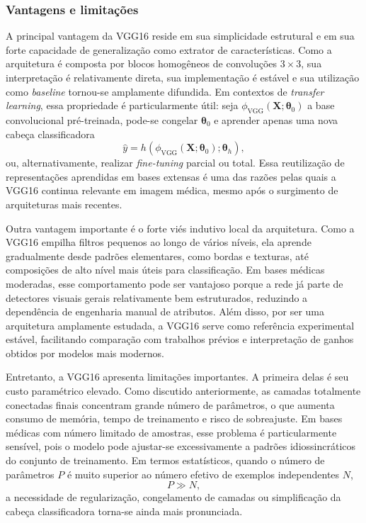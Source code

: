 \documentclass[tcc,capa]{texufpel}
\begin{document}
\subsubsection{Vantagens e limitações}

A principal vantagem da VGG16 reside em sua simplicidade estrutural e em sua forte capacidade de generalização como extrator de características. Como a arquitetura é composta por blocos homogêneos de convoluções \(3\times 3\), sua interpretação é relativamente direta, sua implementação é estável e sua utilização como \textit{baseline} tornou-se amplamente difundida. Em contextos de \textit{transfer learning}, essa propriedade é particularmente útil: seja \(\phi_{\text{VGG}}(\mathbf{X};\boldsymbol{\theta}_0)\) a base convolucional pré-treinada, pode-se congelar \(\boldsymbol{\theta}_0\) e aprender apenas uma nova cabeça classificadora
\begin{equation}
	\hat{y}
	=
	h\!\left(\phi_{\text{VGG}}(\mathbf{X};\boldsymbol{\theta}_0);\boldsymbol{\theta}_h\right),
\end{equation}
ou, alternativamente, realizar \textit{fine-tuning} parcial ou total. Essa reutilização de representações aprendidas em bases extensas é uma das razões pelas quais a VGG16 continua relevante em imagem médica, mesmo após o surgimento de arquiteturas mais recentes. 

Outra vantagem importante é o forte viés indutivo local da arquitetura. Como a VGG16 empilha filtros pequenos ao longo de vários níveis, ela aprende gradualmente desde padrões elementares, como bordas e texturas, até composições de alto nível mais úteis para classificação. Em bases médicas moderadas, esse comportamento pode ser vantajoso porque a rede já parte de detectores visuais gerais relativamente bem estruturados, reduzindo a dependência de engenharia manual de atributos. Além disso, por ser uma arquitetura amplamente estudada, a VGG16 serve como referência experimental estável, facilitando comparação com trabalhos prévios e interpretação de ganhos obtidos por modelos mais modernos. 

Entretanto, a VGG16 apresenta limitações importantes. A primeira delas é seu custo paramétrico elevado. Como discutido anteriormente, as camadas totalmente conectadas finais concentram grande número de parâmetros, o que aumenta consumo de memória, tempo de treinamento e risco de sobreajuste. Em bases médicas com número limitado de amostras, esse problema é particularmente sensível, pois o modelo pode ajustar-se excessivamente a padrões idiossincráticos do conjunto de treinamento. Em termos estatísticos, quando o número de parâmetros \(P\) é muito superior ao número efetivo de exemplos independentes \(N\),
\begin{equation}
	P \gg N,
\end{equation}
a necessidade de regularização, congelamento de camadas ou simplificação da cabeça classificadora torna-se ainda mais pronunciada.
\end{document}
